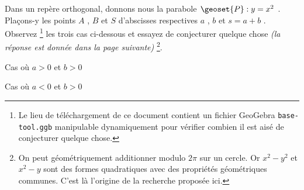 Dans un repère orthogonal, donnons nous la parabole $\geoset{P} : y = x^2$ . Plaçons-y les points $A$ , $B$ et $S$ d'abscisses respectives $a$ , $b$ et  $s = a + b$ .
Observez
\footnote{
	Le lieu de téléchargement de ce document contient un fichier GeoGebra \texttt{base-tool.ggb} manipulable dynamiquement pour vérifier combien il est aisé de conjecturer quelque chose.
}
les trois cas ci-dessous et essayez de conjecturer quelque chose \emph{(la réponse est donnée dans la page suivante)}
\footnote{
	On peut géométriquement additionner modulo $2 \pi$ sur un cercle.
	Or $x^2 - y^2$ et $x^2 - y$ sont des formes quadratiques avec des propriétés géométriques communes.
	C'est là l'origine de la recherche proposée ici.
}.


\vspace{2.5em}

\begin{multicols}{2}
	\center
	\footnotesize
	\itshape
	
	
	\smallskip
	Cas où $a > 0$ et $b > 0$

	\columnbreak
	
	
	\smallskip
	Cas où $a < 0$ et $b > 0$
\end{multicols}
	
